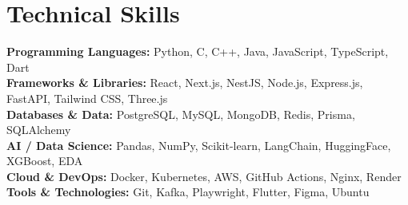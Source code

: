 \documentclass[a4paper,11pt]{article}
\begin{document}
\section*{Technical Skills}
\textbf{Programming Languages:} Python, C, C++, Java, JavaScript, TypeScript, Dart \\
\textbf{Frameworks \& Libraries:} React, Next.js, NestJS, Node.js, Express.js, FastAPI, Tailwind CSS, Three.js \\
\textbf{Databases \& Data:} PostgreSQL, MySQL, MongoDB, Redis, Prisma, SQLAlchemy \\
\textbf{AI / Data Science:} Pandas, NumPy, Scikit-learn, LangChain, HuggingFace, XGBoost, EDA \\
\textbf{Cloud \& DevOps:} Docker, Kubernetes, AWS, GitHub Actions, Nginx, Render \\
\textbf{Tools \& Technologies:} Git, Kafka, Playwright, Flutter, Figma, Ubuntu

\end{document}
